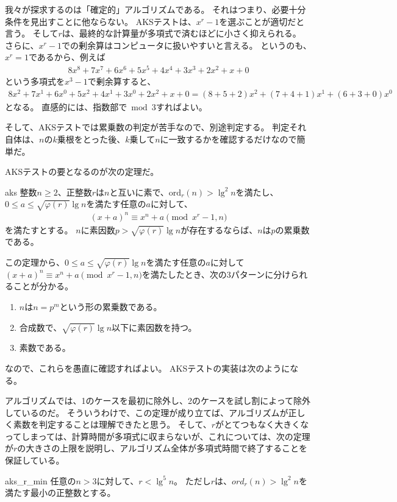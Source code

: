 我々が探求するのは「確定的」アルゴリズムである。
それはつまり、必要十分条件を見出すことに他ならない。
AKSテストは、$x^r-1$を選ぶことが適切だと言う。
そして$r$は、最終的な計算量が多項式で済むほどに小さく抑えられる。
さらに、$x^r-1$での剰余算はコンピュータに扱いやすいと言える。
というのも、$x^r=1$であるから、例えば
\begin{align*}
8x^8 + 7x^7 + 6x^6 + 5x^5 + 4x^4 + 3x^3 + 2x^2 + x + 0
\end{align*}
という多項式を$x^3-1$で剰余算すると、
\begin{align*}
8x^2 + 7x^1 + 6x^0 + 5x^2 + 4x^1 + 3x^0 + 2x^2 + x + 0 = (8 + 5 + 2)x^2 + (7 + 4 + 1)x^1 + (6 + 3 + 0)x^0
\end{align*}
となる。
直感的には、指数部で$\bmod{3}$すればよい。

そして、AKSテストでは累乗数の判定が苦手なので、別途判定する。
判定それ自体は、$n$の$k$乗根をとった後、$k$乗して$n$に一致するかを確認するだけなので簡単だ。

AKSテストの要となるのが次の定理だ。

\begin{Theo}{}{aks}
整数$n\ge2$、正整数$r$は$n$と互いに素で、$\mbox{ord}_r(n)>\lg^2{n}$を満たし、$0\le a \le\sqrt{\varphi(r)}\lg{n}$を満たす任意の$a$に対して、
\begin{align*}
(x+a)^n \equiv x^n + a \pmod{x^r-1, n}
\end{align*}
を満たすとする。
$n$に素因数$p>\sqrt{\varphi(r)}\lg{n}$が存在するならば、$n$は$p$の累乗数である。
\end{Theo}

この定理から、$0\le a \le\sqrt{\varphi(r)}\lg{n}$を満たす任意の$a$に対して$(x+a)^n \equiv x^n + a \pmod{x^r-1, n}$を満たしたとき、次の3パターンに分けられることが分かる。
\begin{enumerate}
 \item $n$は$n=p^m$という形の累乗数である。
 \item 合成数で、$\sqrt{\varphi(r)}\lg{n}$以下に素因数を持つ。
 \item 素数である。
\end{enumerate}

なので、これらを愚直に確認すればよい。
AKSテストの実装は次のようになる。


アルゴリズムでは、1のケースを最初に除外し、2のケースを試し割によって除外しているのだ。
そういうわけで、この定理が成り立てば、アルゴリズムが正しく素数を判定することは理解できたと思う。
そして、$r$がとてつもなく大きくなってしまっては、計算時間が多項式に収まらないが、これについては、次の定理が$r$の大きさの上限を説明し、アルゴリズム全体が多項式時間で終了することを保証している。

\begin{Theo}{}{aks_r_min}
任意の$n>3$に対して、$r<\lg^5{n}$。
ただし$r$は、$ord_r(n) > \lg^2{n}$を満たす最小の正整数とする。
\end{Theo}

